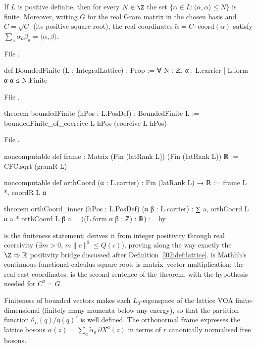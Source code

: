 \begin{theorem}\label{l02:thm:bf}
If $L$ is positive definite, then for every $N\in\Z$ the set $\{\alpha\in L : \langle\alpha,\alpha\rangle\le N\}$ is
finite. Moreover, writing $G$ for the real Gram matrix in the chosen basis and $C = \sqrt G$ (its positive
square root), the real coordinates $\tilde\alpha = C\cdot\mathrm{coord}(\alpha)$ satisfy
$\sum_a\tilde\alpha_a\tilde\beta_a = \langle\alpha,\beta\rangle$.
\end{theorem}

File .
\begin{leancode}
def BoundedFinite (L : IntegralLattice) : Prop :=
  ∀ N : ℤ, {α : L.carrier | L.form α α ≤ N}.Finite
\end{leancode}
File .
\begin{leancode}
theorem boundedFinite (hPos : L.PosDef) : BoundedFinite L :=
  boundedFinite_of_coercive L hPos (coercive L hPos)
\end{leancode}
File .
\begin{leancode}
noncomputable def frame : Matrix (Fin (latRank L)) (Fin (latRank L)) ℝ := CFC.sqrt (gramR L)

noncomputable def orthCoord (α : L.carrier) : Fin (latRank L) → ℝ := frame L *ᵥ coordR L α

theorem orthCoord_inner (hPos : L.PosDef) (α β : L.carrier) :
    ∑ a, orthCoord L α a * orthCoord L β a = ((L.form α β : ℤ) : ℝ) := by
\end{leancode}

\begin{dictionary}
 is the finiteness statement;  derives it from integer
positivity through real coercivity ($\exists m>0$, $m\|c\|^2\le Q(c)$), proving along the way exactly the
$\Z\Rightarrow\mathbb{R}$ positivity bridge discussed after Definition~\ref{l02:def:lattice}.  is
Mathlib's continuous-functional-calculus square root;  is matrix--vector multiplication;
 the real-cast coordinates.  is the second sentence of the
theorem, with the hypothesis  needed for $C^2 = G$.
\end{dictionary}

\begin{physics}
Finiteness of bounded vectors makes each $L_0$-eigenspace of the lattice VOA finite-dimensional
(finitely many momenta below any energy), so that the partition function
$\theta_L(q)/\eta(q)^r$ is well defined. The orthonormal frame expresses the lattice bosons
$\alpha(z) = \sum_a\tilde\alpha_a\,\partial X^a(z)$ in terms of $r$ canonically normalised free bosons.
\end{physics}

